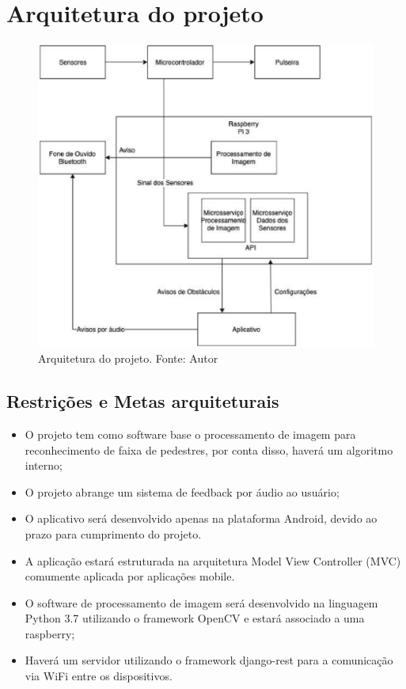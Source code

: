 \chapter{Arquitetura do projeto}

\begin{figure}[ht]
	\centering
    \includegraphics[keepaspectratio=true,scale=0.5]{figuras/arquitetura.eps}
    \caption[Arquitetura do projeto.]{Arquitetura do projeto. Fonte: Autor}
	\label{fig:arquitetura}
\end{figure}

\section{Restrições e Metas arquiteturais}

\begin{itemize}
    \item O projeto tem como software base o processamento de imagem para reconhecimento de faixa de pedestres, por conta disso, haverá um algoritmo interno;
    \item O projeto abrange um sistema de feedback por áudio ao usuário;
    \item O aplicativo será desenvolvido apenas na plataforma Android, devido ao prazo para cumprimento do projeto.
    \item A aplicação estará estruturada na arquitetura Model View Controller (MVC) comumente aplicada por aplicações mobile.
    \item O software de processamento de imagem será desenvolvido na linguagem Python 3.7 utilizando o framework OpenCV e estará associado a uma raspberry;
    \item Haverá um servidor utilizando o framework django-rest para a comunicação via WiFi entre os dispositivos.
\end{itemize}

